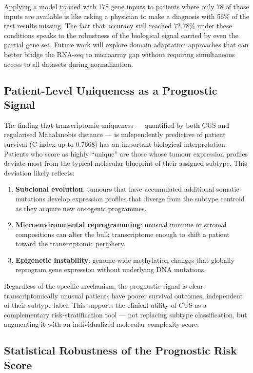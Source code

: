 \documentclass[10pt,a4paper,twocolumn]{article}
\begin{document}
Applying a model trained with 178 gene inputs to patients where only 78 of those inputs are available is like asking a physician to make a diagnosis with 56\% of the test results missing. The fact that accuracy still reached 72.78\% under these conditions speaks to the robustness of the biological signal carried by even the partial gene set. Future work will explore domain adaptation approaches that can better bridge the RNA-seq to microarray gap without requiring simultaneous access to all datasets during normalization.

\subsection{Patient-Level Uniqueness as a Prognostic Signal}

The finding that transcriptomic uniqueness --- quantified by both CUS and regularised Mahalanobis distance --- is independently predictive of patient survival (C-index up to 0.7668) has an important biological interpretation. Patients who score as highly ``unique'' are those whose tumour expression profiles deviate most from the typical molecular blueprint of their assigned subtype. This deviation likely reflects:

\begin{enumerate}
    \item \textbf{Subclonal evolution}: tumours that have accumulated additional somatic mutations develop expression profiles that diverge from the subtype centroid as they acquire new oncogenic programmes.
    \item \textbf{Microenvironmental reprogramming}: unusual immune or stromal compositions can alter the bulk transcriptome enough to shift a patient toward the transcriptomic periphery.
    \item \textbf{Epigenetic instability}: genome-wide methylation changes that globally reprogram gene expression without underlying DNA mutations.
\end{enumerate}

Regardless of the specific mechanism, the prognostic signal is clear: transcriptomically unusual patients have poorer survival outcomes, independent of their subtype label. This supports the clinical utility of CUS as a complementary risk-stratification tool --- not replacing subtype classification, but augmenting it with an individualized molecular complexity score.

\subsection{Statistical Robustness of the Prognostic Risk Score}
\end{document}
